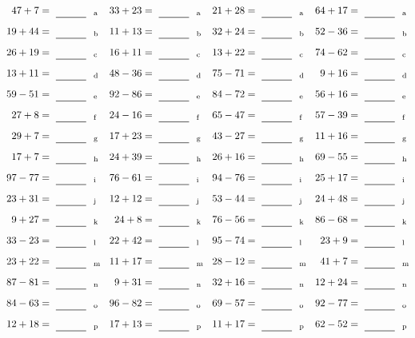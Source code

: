\documentclass
[
  draft    = true,
  fontsize = 11pt,
  parskip  = half-
]
{scrartcl}
\begin{document}
\clearpage
\begin{align*}
    \pline{47+7}&=\rline{a}
  & \pline{33+23}&=\rline{a}
  & \pline{21+28}&=\rline{a}
  & \pline{64+17}&=\rline{a} \\[1ex]
    \pline{19+44}&=\rline{b}
  & \pline{11+13}&=\rline{b}
  & \pline{32+24}&=\rline{b}
  & \pline{52-36}&=\rline{b} \\[1ex]
    \pline{26+19}&=\rline{c}
  & \pline{16+11}&=\rline{c}
  & \pline{13+22}&=\rline{c}
  & \pline{74-62}&=\rline{c} \\[1ex]
    \pline{13+11}&=\rline{d}
  & \pline{48-36}&=\rline{d}
  & \pline{75-71}&=\rline{d}
  & \pline{9+16}&=\rline{d} \\[1ex]
    \pline{59-51}&=\rline{e}
  & \pline{92-86}&=\rline{e}
  & \pline{84-72}&=\rline{e}
  & \pline{56+16}&=\rline{e} \\[1ex]
    \pline{27+8}&=\rline{f}
  & \pline{24-16}&=\rline{f}
  & \pline{65-47}&=\rline{f}
  & \pline{57-39}&=\rline{f} \\[1ex]
    \pline{29+7}&=\rline{g}
  & \pline{17+23}&=\rline{g}
  & \pline{43-27}&=\rline{g}
  & \pline{11+16}&=\rline{g} \\[1ex]
    \pline{17+7}&=\rline{h}
  & \pline{24+39}&=\rline{h}
  & \pline{26+16}&=\rline{h}
  & \pline{69-55}&=\rline{h} \\[1ex]
    \pline{97-77}&=\rline{i}
  & \pline{76-61}&=\rline{i}
  & \pline{94-76}&=\rline{i}
  & \pline{25+17}&=\rline{i} \\[1ex]
    \pline{23+31}&=\rline{j}
  & \pline{12+12}&=\rline{j}
  & \pline{53-44}&=\rline{j}
  & \pline{24+48}&=\rline{j} \\[1ex]
    \pline{9+27}&=\rline{k}
  & \pline{24+8}&=\rline{k}
  & \pline{76-56}&=\rline{k}
  & \pline{86-68}&=\rline{k} \\[1ex]
    \pline{33-23}&=\rline{l}
  & \pline{22+42}&=\rline{l}
  & \pline{95-74}&=\rline{l}
  & \pline{23+9}&=\rline{l} \\[1ex]
    \pline{23+22}&=\rline{m}
  & \pline{11+17}&=\rline{m}
  & \pline{28-12}&=\rline{m}
  & \pline{41+7}&=\rline{m} \\[1ex]
    \pline{87-81}&=\rline{n}
  & \pline{9+31}&=\rline{n}
  & \pline{32+16}&=\rline{n}
  & \pline{12+24}&=\rline{n} \\[1ex]
    \pline{84-63}&=\rline{o}
  & \pline{96-82}&=\rline{o}
  & \pline{69-57}&=\rline{o}
  & \pline{92-77}&=\rline{o} \\[1ex]
    \pline{12+18}&=\rline{p}
  & \pline{17+13}&=\rline{p}
  & \pline{11+17}&=\rline{p}
  & \pline{62-52}&=\rline{p}
\end{align*}
\end{document}
